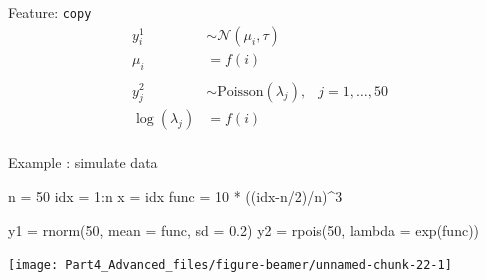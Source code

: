 \documentclass[
  ignorenonframetext,
]{beamer}
\newenvironment{Shaded}{\begin{snugshade}}{\end{snugshade}}
\newcommand{\AttributeTok}[1]{\textcolor[rgb]{0.77,0.63,0.00}{#1}}
\newcommand{\DecValTok}[1]{\textcolor[rgb]{0.00,0.00,0.81}{#1}}
\newcommand{\FloatTok}[1]{\textcolor[rgb]{0.00,0.00,0.81}{#1}}
\newcommand{\FunctionTok}[1]{\textcolor[rgb]{0.00,0.00,0.00}{#1}}
\newcommand{\NormalTok}[1]{#1}
\newcommand{\OtherTok}[1]{\textcolor[rgb]{0.56,0.35,0.01}{#1}}
\newcommand{\SpecialCharTok}[1]{\textcolor[rgb]{0.00,0.00,0.00}{#1}}
\begin{document}
\begin{frame}{Feature: \texttt{copy}}
\protect\hypertarget{feature-copy-4}{}
\[
\begin{aligned}
y^1_i & \sim \mathcal{N}(\mu_i,\tau)\\
\mu_i &= f(i)\\
\\
y^2_j & \sim \text{Poisson}(\lambda_j),& j = 1,\dots,50\\
\log(\lambda_j) &= f(i)\\
\end{aligned}
\]
\end{frame}

\begin{frame}[fragile]{Example : simulate data}
\protect\hypertarget{example-simulate-data-3}{}
\footnotesize

\begin{Shaded}
\begin{Highlighting}[]
\NormalTok{n }\OtherTok{=} \DecValTok{50}
\NormalTok{idx }\OtherTok{=} \DecValTok{1}\SpecialCharTok{:}\NormalTok{n}
\NormalTok{x }\OtherTok{=}\NormalTok{ idx}
\NormalTok{func }\OtherTok{=} \DecValTok{10} \SpecialCharTok{*}\NormalTok{ ((idx}\SpecialCharTok{{-}}\NormalTok{n}\SpecialCharTok{/}\DecValTok{2}\NormalTok{)}\SpecialCharTok{/}\NormalTok{n)}\SpecialCharTok{\^{}}\DecValTok{3}

\NormalTok{y1 }\OtherTok{=} \FunctionTok{rnorm}\NormalTok{(}\DecValTok{50}\NormalTok{, }\AttributeTok{mean =}\NormalTok{ func, }\AttributeTok{sd =} \FloatTok{0.2}\NormalTok{)}
\NormalTok{y2 }\OtherTok{=} \FunctionTok{rpois}\NormalTok{(}\DecValTok{50}\NormalTok{, }\AttributeTok{lambda  =} \FunctionTok{exp}\NormalTok{(func))}
\end{Highlighting}
\end{Shaded}

\begin{center}\texttt{[image: Part4\_Advanced\_files/figure-beamer/unnamed-chunk-22-1]} \end{center}
\normalsize
\end{frame}
\end{document}
